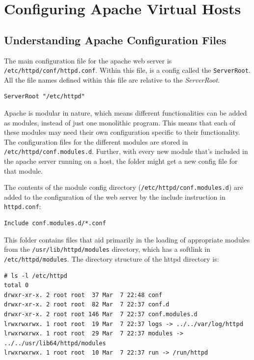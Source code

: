 \chapter{Configuring Apache Virtual Hosts}

	\section{Understanding Apache Configuration Files}
The main configuration file for the apache web server is \verb|/etc/httpd/conf/httpd.conf|. Within this file, is a config called the \verb|ServerRoot|. All the file names defined within this file are relative to the \textit{ServerRoot}. 

\vspace{-15pt}
\begin{verbatim}
ServerRoot "/etc/httpd"
\end{verbatim}
\vspace{-10pt}	

\noindent
Apache is modular in nature, which means different functionalities can be added as modules, instead of just one monolithic program. This means that each of these modules may need their own configuration specific to their functionality. The configuration files for the different modules are stored in \verb|/etc/httpd/conf.modules.d|. Further, with every new module that's included in the apache server running on a host, the folder might get a new config file for that module. 

The contents of the module config directory (\verb|/etc/httpd/conf.modules.d|) are added to the configuration of the web server by the include instruction in \verb|httpd.conf|:

\vspace{-15pt}
\begin{verbatim}
Include conf.modules.d/*.conf
\end{verbatim}
\vspace{-10pt}	

\noindent
This folder contains files that aid primarily in the loading of appropriate modules from the \verb|/usr/lib/httpd/modules| directory, which has a softlink in \verb|/etc/httpd/modules|. The directory structure of the httpd directory is:

\vspace{-15pt}
\begin{verbatim}
# ls -l /etc/httpd
total 0
drwxr-xr-x. 2 root root  37 Mar  7 22:48 conf
drwxr-xr-x. 2 root root  82 Mar  7 22:37 conf.d
drwxr-xr-x. 2 root root 146 Mar  7 22:37 conf.modules.d
lrwxrwxrwx. 1 root root  19 Mar  7 22:37 logs -> ../../var/log/httpd
lrwxrwxrwx. 1 root root  29 Mar  7 22:37 modules -> ../../usr/lib64/httpd/modules
lrwxrwxrwx. 1 root root  10 Mar  7 22:37 run -> /run/httpd
\end{verbatim}
\vspace{-10pt}	


